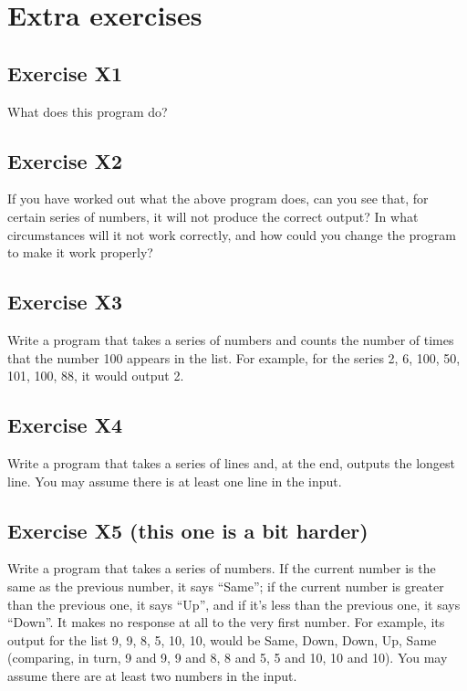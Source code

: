 \section{Extra exercises}
\label{sec:additional-exercises}

\subsection*{Exercise X1}

What does this program do?


\subsection*{Exercise X2}

If you have worked out what the above program does, can you
see that, for certain series of numbers, it will not produce the correct
output?  In what circumstances will it not work correctly, and how could
you change the program to make it work properly?

\subsection*{Exercise X3}

Write a program that takes a series of numbers and counts
the number of times that the number 100 appears in the list.  For example,
for the series 2, 6, 100, 50, 101, 100, 88, it would output 2.

\subsection*{Exercise X4}

Write a program that takes a series of lines and,
at the end, outputs the longest line.
You may assume there is at least one line in the input.

\subsection*{Exercise X5 (this one is a bit harder)}

Write a program that takes
a series of numbers.  If the
current number is the same as the previous number, it says ``Same'';
if the current number is greater than the previous one, it says ``Up'',
and if it's less than the previous one, it says ``Down''.
It makes no response at all to the
very first number.  For example, its output for the list 9, 9, 8, 5, 10, 10,
would be Same, Down, Down, Up, Same
(comparing, in turn, 9 and 9, 9 and 8, 8 and 5, 5 and 10, 10 and 10).
You may assume there are at least two numbers in the input.


